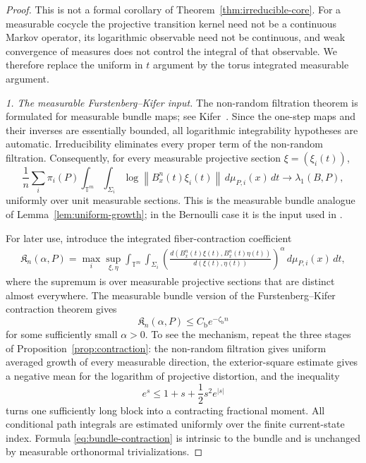 \documentclass[11pt,a4paper]{amsart}
\newcommand{\T}{\mathbb T}
\newcommand{\norm}[1]{\left\lVert #1\right\rVert}
\begin{document}
\begin{proof}
This is not a formal corollary of
Theorem~\ref{thm:irreducible-core}.  For a measurable cocycle the
projective transition kernel need not be a continuous Markov operator, its logarithmic
observable need not be continuous, and weak convergence of
measures does not control the integral of that observable.%
We therefore replace the
uniform in \(t\)  argument by the torus integrated
measurable argument.%

\smallskip
\noindent\emph{1. The measurable Furstenberg--Kifer input.}
The non-random filtration theorem is formulated for measurable bundle
maps; see Kifer~\cite[Chapter~III]{Kifer}.  Since the one-step maps and
their inverses are essentially bounded, all logarithmic integrability
hypotheses are automatic.  Irreducibility eliminates every proper
term of the non-random filtration.  Consequently, for every measurable
projective section \(\xi=(\xi_i(t))\),
\[
 \frac1n\sum_i\pi_i(P)
 \int_{\T^m}
 \int_{\Sigma_i}
 \log\norm{B_x^n(t)\xi_i(t)}
 \,d\mu_{P,i}(x)\,dt
 \longrightarrow\lambda_1(B,P),
\]
uniformly over unit measurable sections.  This is the measurable
bundle analogue of Lemma~\ref{lem:uniform-growth}; in the Bernoulli
case it is the input used in \cite[Proposition~7]{BST}.

For later use, introduce the integrated fiber-contraction coefficient
\[
\begin{aligned}
 \mathfrak K_n(\alpha,P)
 =\max_i\sup_{\xi,\eta}
 \int_{\T^m}\int_{\Sigma_i}
 \left(
 \frac{
 d(B_x^n(t)\xi(t),B_x^n(t)\eta(t))}
 {d(\xi(t),\eta(t))}
 \right)^\alpha
 \,d\mu_{P,i}(x)\,dt,
\end{aligned}
\]
where the supremum is over measurable projective sections that are
distinct almost everywhere.  The measurable bundle version of the
Furstenberg--Kifer contraction theorem gives
\begin{equation}\label{eq:bundle-contraction}
 \mathfrak K_n(\alpha,P)
 \le C_{\mathrm b}e^{-\zeta_{\mathrm b}n}
\end{equation}
for some sufficiently small \(\alpha>0\).  To see the mechanism,
repeat the three stages of Proposition~\ref{prop:contraction}: the
non-random filtration gives uniform averaged growth of every
measurable direction, the exterior-square estimate gives a negative
mean for the logarithm of projective distortion, and the inequality
\[
 e^s\le1+s+\frac12s^2e^{|s|}
\]
turns one sufficiently long block into a contracting fractional
moment.  All conditional path integrals are estimated uniformly over
the finite current-state index.  Formula
\eqref{eq:bundle-contraction} is intrinsic to the bundle and is
unchanged by measurable orthonormal trivializations.


\end{proof}
\end{document}
